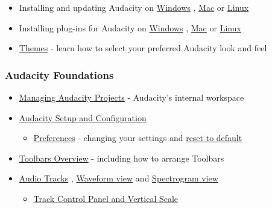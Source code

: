 \begin{multicols}{2}
\begin{itemize}
\item Installing and updating Audacity on 
\hyperref[\foo{man:installing:and:updating:audacity:on:windows:}]{Windows}
, 
\hyperref[\foo{man:installing:and:updating:audacity:on:mac:os:x:}]{Mac}
 or 
\hyperref[\foo{man:installing:and:updating:audacity:on:linux:}]{Linux}

\item Installing plug-ins for Audacity on 
\hyperref[\foo{man:installing:effect:generator:and:analyzer:plug:ins:on:windows:}]{Windows}
, 
\hyperref[\foo{man:installing:effect:generator:and:analyzer:plug:ins:on:mac:os:x:}]{Mac}
 or 
\hyperref[\foo{man:installing:effect:generator:and:analyzer:plug:ins:on:linux:}]{Linux}

\item 
\hyperref[\foo{man:themes:}]{Themes}
 - learn how to select your preferred Audacity look and feel
\end{itemize}

\subsubsection{Audacity Foundations}
\begin{itemize}
\item 
\hyperref[\foo{man:audacity:projects:}]{Managing Audacity Projects}
 - Audacity's internal workspace 
\item 
\hyperref[\foo{man:audacity:setup:and:configuration:}]{Audacity Setup and Configuration}

\begin{itemize}
\item 
\hyperref[\foo{man:preferences:}]{Preferences}
 - changing your settings and 
\hyperref[\foo{man:faq:installation:and:plug:ins:reset}]{reset to default}

\end{itemize}

\item 
\hyperref[\foo{man:toolbars:overview:}]{Toolbars Overview}
 - including how to arrange Toolbars
\item 
\hyperref[\foo{man:audio:tracks:}]{Audio Tracks}
, 
\hyperref[\foo{man:audacity:waveform:}]{Waveform view}
 and 
\hyperref[\foo{man:spectrogram:view:}]{Spectrogram view}

\begin{itemize}
\item 
\hyperref[\foo{man:track:control:panel:and:vertical:scale:}]{Track Control Panel and Vertical Scale}


\end{itemize}
\end{itemize}
\end{multicols}
